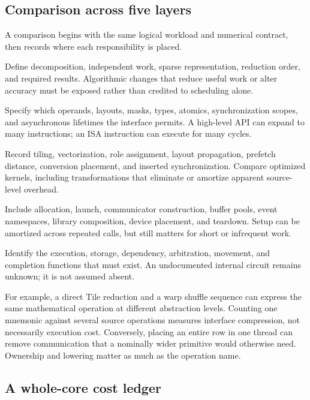 \subsection{Comparison across five layers}

A comparison begins with the same logical workload and numerical contract, then records where each responsibility is placed.
\begin{description}[style=nextline,leftmargin=0em,labelwidth=0em]
 \item[Algorithm.] Define decomposition, independent work, sparse representation, reduction order, and required results. Algorithmic changes that reduce useful work or alter accuracy must be exposed rather than credited to scheduling alone.
 \item[Instruction set or programming contract.] Specify which operands, layouts, masks, types, atomics, synchronization scopes, and asynchronous lifetimes the interface permits. A high-level API can expand to many instructions; an ISA instruction can execute for many cycles.
 \item[Compiler and kernel.] Record tiling, vectorization, role assignment, layout propagation, prefetch distance, conversion placement, and inserted synchronization. Compare optimized kernels, including transformations that eliminate or amortize apparent source-level overhead.
 \item[Runtime and libraries.] Include allocation, launch, communicator construction, buffer pools, event namespaces, library composition, device placement, and teardown. Setup can be amortized across repeated calls, but still matters for short or infrequent work.
 \item[Hardware.] Identify the execution, storage, dependency, arbitration, movement, and completion functions that must exist. An undocumented internal circuit remains unknown; it is not assumed absent.
\end{description}

For example, a direct Tile reduction and a warp shuffle sequence can express the same mathematical operation at different abstraction levels. Counting one mnemonic against several source operations measures interface compression, not necessarily execution cost. Conversely, placing an entire row in one thread can remove communication that a nominally wider primitive would otherwise need. Ownership and lowering matter as much as the operation name.

\subsection{A whole-core cost ledger}

